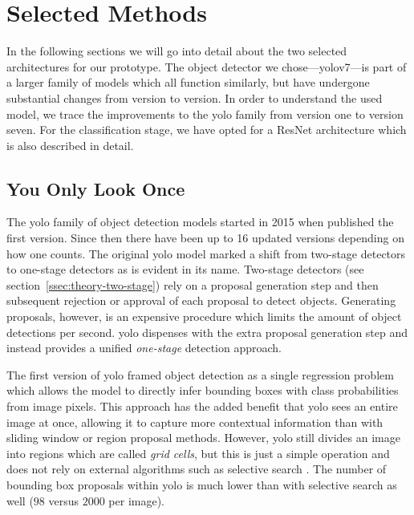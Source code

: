 \documentclass[draft,final]{vutinfth} %
\begin{document}
\section{Selected Methods}
\label{sec:selected-methods}

In the following sections we will go into detail about the two
selected architectures for our prototype. The object detector we
chose---\gls{yolo}v7---is part of a larger family of models which all
function similarly, but have undergone substantial changes from
version to version. In order to understand the used model, we trace
the improvements to the \gls{yolo} family from version one to version
seven. For the classification stage, we have opted for a ResNet
architecture which is also described in detail.

\subsection{You Only Look Once}
\label{sec:methods-detection}

The \gls{yolo} family of object detection models started in 2015 when
\cite{redmon2016} published the first version. Since then there have
been up to 16 updated versions depending on how one counts. The
original \gls{yolo} model marked a shift from two-stage detectors to
one-stage detectors as is evident in its name. Two-stage detectors
(see section~\ref{ssec:theory-two-stage}) rely on a proposal
generation step and then subsequent rejection or approval of each
proposal to detect objects. Generating proposals, however, is an
expensive procedure which limits the amount of object detections per
second. \gls{yolo} dispenses with the extra proposal generation step
and instead provides a unified \emph{one-stage} detection approach.

The first version of \gls{yolo} \cite{redmon2016} framed object
detection as a single regression problem which allows the model to
directly infer bounding boxes with class probabilities from image
pixels. This approach has the added benefit that \gls{yolo} sees an
entire image at once, allowing it to capture more contextual
information than with sliding window or region proposal
methods. However, \gls{yolo} still divides an image into regions which
are called \emph{grid cells}, but this is just a simple operation and
does not rely on external algorithms such as selective search
\cite{uijlings2013}. The number of bounding box proposals within
\gls{yolo} is much lower than with selective search as well ($98$
versus $2000$ per image).
\end{document}
